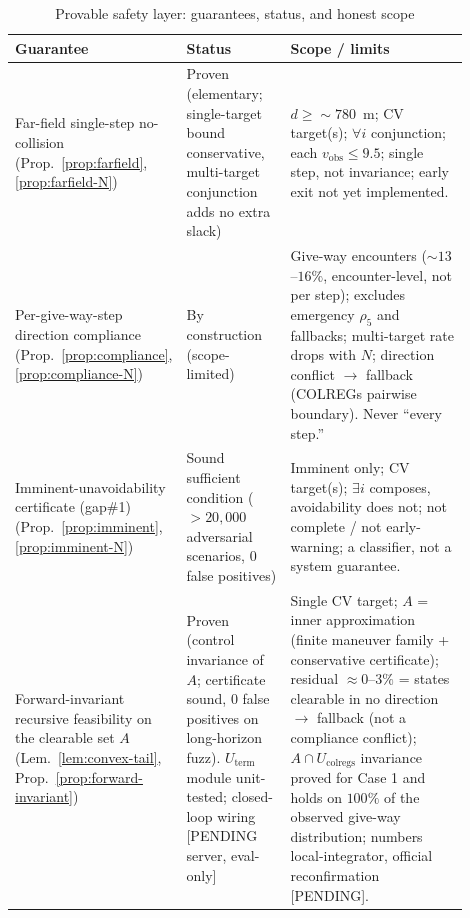 \begin{table}[h]
  \caption{Provable safety layer: guarantees, status, and honest scope}
  \label{tab:provable}
  \centering
  \small
  \begin{tabular}{@{}p{0.20\linewidth}p{0.24\linewidth}p{0.46\linewidth}@{}}
    \toprule
    \textbf{Guarantee} & \textbf{Status} & \textbf{Scope / limits} \\
    \midrule
    Far-field single-step no-collision (Prop.~\ref{prop:farfield},
    \ref{prop:farfield-N})
      & Proven (elementary; single-target bound conservative, multi-target conjunction adds no extra slack)
      & $d\ge\sim\!780$~m; CV target(s); $\forall i$ conjunction; each
        $v_{\mathrm{obs}}\le9.5$; single step, not invariance; early exit not yet
        implemented. \\
    \addlinespace
    Per-give-way-step direction compliance (Prop.~\ref{prop:compliance},
    \ref{prop:compliance-N})
      & By construction (scope-limited)
      & Give-way encounters ($\sim\!13$--$16\%$, encounter-level, not per step);
        excludes emergency $\rho_5$ and fallbacks; multi-target rate drops with $N$;
        direction conflict $\to$ fallback (COLREGs pairwise boundary). Never ``every
        step.'' \\
    \addlinespace
    Imminent-unavoidability certificate (gap\#1) (Prop.~\ref{prop:imminent},
    \ref{prop:imminent-N})
      & Sound sufficient condition ($>\!20{,}000$ adversarial scenarios, 0 false positives)
      & Imminent only; CV target(s); $\exists i$ composes, avoidability does not;
        not complete / not early-warning; a classifier, not a system guarantee. \\
    \addlinespace
    Forward-invariant recursive feasibility on the clearable set $A$
    (Lem.~\ref{lem:convex-tail}, Prop.~\ref{prop:forward-invariant})
      & Proven (control invariance of $A$; certificate sound, 0 false positives on
        long-horizon fuzz). $U_{\mathrm{term}}$ module unit-tested; closed-loop wiring
        [PENDING server, eval-only]
      & Single CV target; $A$ = inner approximation (finite maneuver family +
        conservative certificate); residual $\approx\!0$--$3\%$ = states clearable in
        no direction $\to$ fallback (not a compliance conflict); $A\cap U_{\mathrm{colregs}}$
        invariance proved for Case 1 and holds on $100\%$ of the observed give-way
        distribution; numbers local-integrator, official reconfirmation [PENDING]. \\
    \bottomrule
  \end{tabular}
\end{table}

